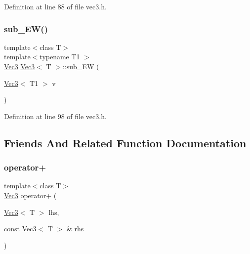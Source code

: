 Definition at line 88 of file vec3.\+h.

\mbox{\label{class_vec3_a234dadfe29347670784c0e7ebd8bf67f}} 
\subsubsection{\texorpdfstring{sub\_EW()}{sub\_EW()}\hspace{0.1cm}{\footnotesize\ttfamily [2/2]}}
{\footnotesize\ttfamily template$<$class T$>$ \\
template$<$typename T1 $>$ \\
\mbox{\hyperlink{class_vec3}{Vec3}} \mbox{\hyperlink{class_vec3}{Vec3}}$<$ T $>$\+::sub\+\_\+\+EW (\begin{DoxyParamCaption}\item[{\mbox{\hyperlink{class_vec3}{Vec3}}$<$ T1 $>$}]{v }\end{DoxyParamCaption})\hspace{0.3cm}{\ttfamily [inline]}}



Definition at line 98 of file vec3.\+h.



\subsection{Friends And Related Function Documentation}
\mbox{\label{class_vec3_aa1d442ec2866889ad4514da9a51c8be5}} 
\subsubsection{\texorpdfstring{operator+}{operator+}}
{\footnotesize\ttfamily template$<$class T$>$ \\
\mbox{\hyperlink{class_vec3}{Vec3}} operator+ (\begin{DoxyParamCaption}\item[{\mbox{\hyperlink{class_vec3}{Vec3}}$<$ T $>$}]{lhs,  }\item[{const \mbox{\hyperlink{class_vec3}{Vec3}}$<$ T $>$ \&}]{rhs }\end{DoxyParamCaption})\hspace{0.3cm}{\ttfamily [friend]}}



